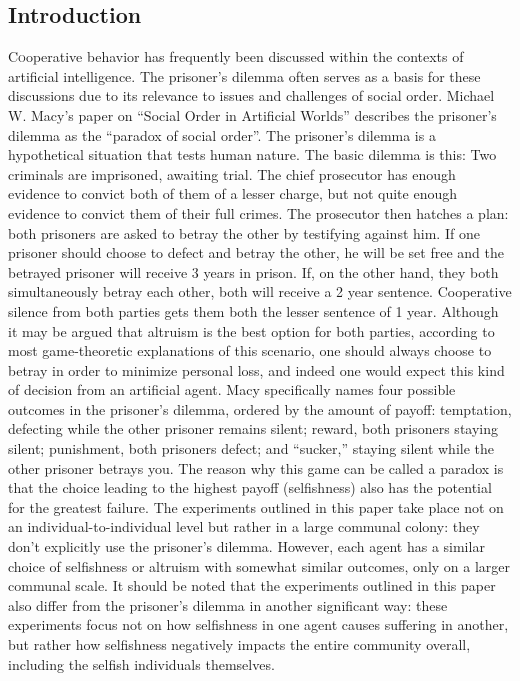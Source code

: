 \documentclass[twoside]{article}
\begin{document}
\begin{multicols}{2} %

\section{Introduction}

	\lettrine[nindent=0em,lines=2]{C} ooperative behavior has frequently been discussed within the contexts of artificial intelligence. The prisoner's dilemma often serves as a basis for these discussions due to its relevance to issues and challenges of social order. Michael W. Macy's paper on ``Social Order in Artificial Worlds'' describes the prisoner's dilemma as the ``paradox of social order''. \cite{macy} The prisoner's dilemma is a hypothetical situation that tests human nature. The basic dilemma is this: Two criminals are imprisoned, awaiting trial. The chief prosecutor has enough evidence to convict both of them of a lesser charge, but not quite enough evidence to convict them of their full crimes. The prosecutor then hatches a plan: both prisoners are asked to betray the other by testifying against him. If one prisoner should choose to defect and betray the other, he will be set free and the betrayed prisoner will receive 3 years in prison. If, on the other hand, they both simultaneously betray each other, both will receive a 2 year sentence. Cooperative silence from both parties gets them both the lesser sentence of 1 year. Although it may be argued that altruism is the best option for both parties, according to most game-theoretic explanations of this scenario, one should always choose to betray in order to minimize personal loss, and indeed one would expect this kind of decision from an artificial agent. Macy specifically names four possible outcomes in the prisoner's dilemma, ordered by the amount of payoff: temptation, defecting while the other prisoner remains silent; reward, both prisoners staying silent; punishment, both prisoners defect; and ``sucker,'' staying silent while the other prisoner betrays you. The reason why this game can be called a paradox is that the choice leading to the highest payoff (selfishness) also has the potential for the greatest failure. The experiments outlined in this paper take place not on an individual-to-individual level but rather in a large communal colony: they don't explicitly use the prisoner's dilemma. However, each agent has a similar choice of selfishness or altruism with somewhat similar outcomes, only on a larger communal scale. It should be noted that the experiments outlined in this paper also differ from the prisoner's dilemma in another significant way: these experiments focus not on how selfishness in one agent causes suffering in another, but rather how selfishness negatively impacts the entire community overall, including the selfish individuals themselves.



\end{multicols}
\end{document}
